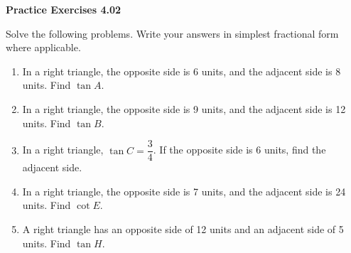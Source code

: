 \vspace{0.3ex}
\noindent\textbf{Practice Exercises 4.02}

\vspace{0.2ex}

Solve the following problems. Write your answers in simplest fractional form where applicable.

\begin{enumerate}
    \item In a right triangle, the opposite side is 6 units, and the adjacent side is 8 units. Find $\tan A$.
    \item In a right triangle, the opposite side is 9 units, and the adjacent side is 12 units. Find $\tan B$.
    \item In a right triangle, $\tan C = \dfrac{3}{4}$. If the opposite side is 6 units, find the adjacent side.
    \item In a right triangle, the opposite side is 7 units, and the adjacent side is 24 units. Find $\cot E$.
    \item A right triangle has an opposite side of 12 units and an adjacent side of 5 units. Find $\tan H$.
\end{enumerate}
